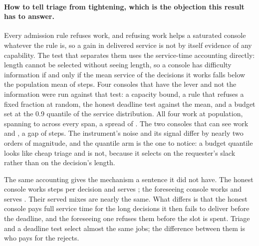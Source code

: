 \documentclass[11pt]{article}
\begin{document}
\paragraph{How to tell triage from tightening, which is the objection this result has to answer.}
Every admission rule refuses work, and refusing work helps a saturated console whatever the rule is,
so a gain in delivered service is not by itself evidence of any capability. The test that separates
them uses the service-time accounting directly: length cannot be selected without seeing length, so
a console has difficulty information if and only if the mean service of the decisions it works falls
below the population mean of \AcPop{} steps. Four consoles that have the lever and not the
information were run against that test: a capacity bound, a rule that refuses a fixed fraction at
random, the honest deadline test against the mean, and a budget set at the 0.9 quantile of the
service distribution. All four work at population, spanning \AcFreeLo{} to \AcFreeHi{} across every
span, a spread of \AcFreeSpread{}. The two consoles that can see work \AcWorkHalf{} and
\AcWorkFore{}, a gap of \AcSelectGap{} steps. The instrument's noise and its signal differ by nearly
two orders of magnitude, and the quantile arm is the one to notice: a budget quantile looks like
cheap triage and is not, because it selects on the requester's slack rather than on the decision's
length.

The same accounting gives the mechanism a sentence it did not have. The honest console works
\AcWorkMean{} steps per decision and serves \AcServeMean{}; the foreseeing console works
\AcServeFore{} and serves \AcServeFore{}. Their served mixes are nearly the same. What differs is
that the honest console pays full service time for the long decisions it then fails to deliver
before the deadline, and the foreseeing one refuses them before the slot is spent. Triage and a
deadline test select almost the same jobs; the difference between them is who pays for the rejects.
\end{document}

